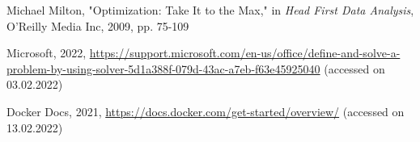 \documentclass{article}
\begin{document}
\begin{multicols}{2}
\begin{thebibliography}{2}
  Michael Milton, "Optimization: Take It to the Max," in  \textit{Head First Data Analysis}, O'Reilly Media Inc, 2009, pp. 75-109
 
  Microsoft, 2022, \url{https://support.microsoft.com/en-us/office/define-and-solve-a-problem-by-using-solver-5d1a388f-079d-43ac-a7eb-f63e45925040} (accessed on 03.02.2022)

  Docker Docs, 2021, \url{https://docs.docker.com/get-started/overview/} (accessed on 13.02.2022)
 
\end{thebibliography}
\end{multicols}
\end{document}

